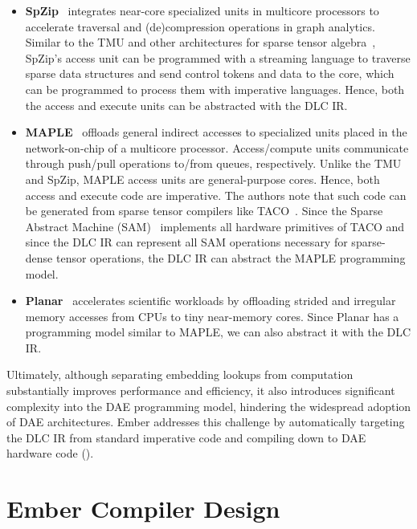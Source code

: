 \begin{itemize}
\item \textbf{SpZip}~\cite{yang2021isca} integrates near-core specialized units in multicore processors to accelerate traversal and (de)compression operations in graph analytics. Similar to the TMU and other architectures for sparse tensor algebra~\cite{hsu2023asplos}, SpZip's access unit can be programmed with a streaming language to traverse sparse data structures and send control tokens and data to the core, which can be programmed to process them with imperative languages. Hence, both the access and execute units can be abstracted with the DLC IR.
\item \textbf{MAPLE}~\cite{orenesvera2022isca} offloads general indirect accesses to specialized units placed in the network-on-chip of a multicore processor. Access/compute units communicate through push/pull operations to/from queues, respectively. Unlike the TMU and SpZip, MAPLE access units are general-purpose cores. Hence, both access and execute code are imperative. The authors note that such code can be generated from sparse tensor compilers like TACO~\cite{kjolstad2017oopsla}. Since the Sparse Abstract Machine (SAM)~\cite{hsu2023asplos} implements all hardware primitives of TACO and since the DLC IR can represent all SAM operations necessary for sparse-dense tensor operations, the DLC IR can abstract the MAPLE programming model.
\item \textbf{Planar}~\cite{barredo2021sc} accelerates scientific workloads by offloading strided and irregular memory accesses from CPUs to tiny near-memory cores. Since Planar has a programming model similar to MAPLE, we can also abstract it with the DLC IR.
\end{itemize}
Ultimately, although separating embedding lookups from computation substantially improves performance and efficiency, it also introduces significant complexity into the DAE programming model, hindering the widespread adoption of DAE architectures. Ember addresses this challenge by automatically targeting the DLC IR from standard imperative code and compiling down to DAE hardware code ().

\section{Ember Compiler Design} \label{sec:ember-compiler}


